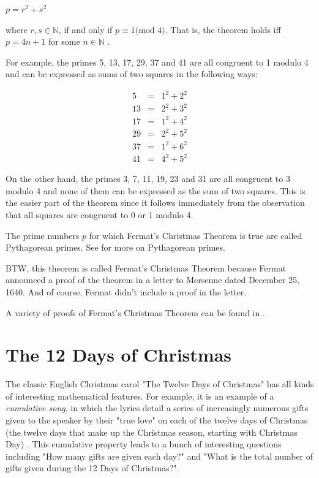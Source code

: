 \documentclass{article}
\theoremstyle{definition}
\begin{document}
\smallskip
\begin{center}
\scalebox{1.25} {$p = r^{2} + s^{2}$}
\end{center}

\smallskip
\noindent
where $r,s \in \mathbb{N}$, if and only if $p \equiv 1 \textrm{
(mod $4$)}$. That is, the theorem holds iff $p = 4n + 1$ for some
$n \in \mathbb{N}$ \cite{wiki:christmas_theorem}.

\bigskip
\noindent
For example, the primes 5, 13, 17, 29, 37 and 41 are all
congruent to 1 modulo 4 and can be expressed as sums of two
squares in the following ways:

\smallskip
\begin{equation*}
\begin{array}{rcll} 
5   &=& 1^{2} + 2^{2}   \\
13  &=& 2^{2} + 3^{2}   \\
17  &=& 1^{2} + 4^{2}   \\
29  &=& 2^{2} + 5^{2}   \\
37  &=& 1^{2} + 6^{2}   \\
41  &=& 4^{2} + 5^{2}
\end{array}
\end{equation*}


\bigskip
\noindent
On the other hand, the primes 3, 7, 11, 19, 23 and 31 are all
congruent to 3 modulo 4 and none of them can be expressed as the
sum of two squares. This is the easier part of the theorem since
it follows immediately from the observation that all squares are
congruent to 0 or 1 modulo 4.


\bigskip
\noindent
The prime numbers $p$ for which Fermat's Christmas Theorem is
true are called Pythagorean primes.  See
\cite{wiki:pythagorean_primes} for more on Pythagorean primes.

\bigskip
\noindent
BTW, this theorem is called Fermat's Christmas Theorem because
Fermat announced a proof of the theorem in a letter to Mersenne
dated December 25, 1640. And of course, Fermat didn't include a
proof in the letter.


\bigskip
\noindent
A variety of proofs of Fermat's Christmas Theorem can be found in
\cite{wiki:christmas_theorem_proofs}.
%
%
%
\section{The 12 Days of Christmas}
\label{sec:12_days_of_christmas}
The classic English Christmas carol "The Twelve Days of
Christmas" has all kinds of interesting mathematical
features. For example, it is an example of a \emph{cumulative
song}, in which the lyrics detail a series of increasingly
numerous gifts given to the speaker by their "true love" on each
of the twelve days of Christmas (the twelve days that make up the
Christmas season, starting with Christmas Day)
\cite{wikipedia:cumulative_song}. This cumulative property leads
to a bunch of interesting questions including "How many gifts are
given each day?" and "What is the total number of gifts given
during the 12 Days of Christmas?".
\end{document}
